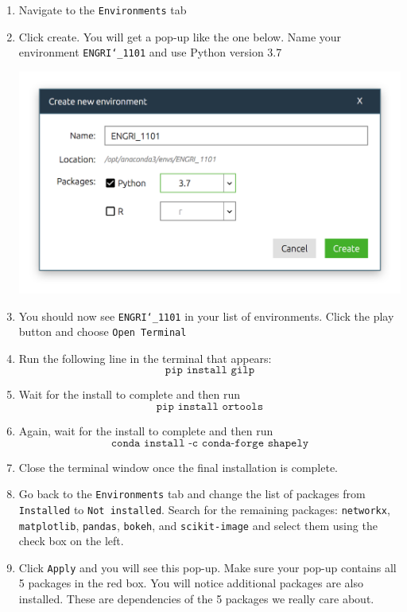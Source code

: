 \documentclass[11 pt]{article}
\begin{document}
\begin{enumerate}

\item Navigate to the \texttt{Environments} tab
\item Click create. You will get a pop-up like the one below. Name your environment \texttt{ENGRI\char`_1101} and use Python version 3.7

\begin{center}
\includegraphics[scale=0.5]{create_env}
\end{center}

\item You should now see \texttt{ENGRI\char`_1101} in your list of environments. Click the play button and choose \texttt{Open Terminal}
\item Run the following line in the terminal that appears: $$\texttt{pip install gilp}$$
\item Wait for the install to complete and then run $$\texttt{pip install ortools}$$
\item Again, wait for the install to complete and then run $$\texttt{conda install -c conda-forge shapely}$$
\item Close the terminal window once the final installation is complete.
\item Go back to the \texttt{Environments} tab and change the list of packages from \texttt{Installed} to \texttt{Not installed}. Search for the remaining packages: \texttt{networkx}, \texttt{matplotlib}, \texttt{pandas},  \texttt{bokeh}, and  \texttt{scikit-image} and select them using the check box on the left.
\item Click \texttt{Apply} and you will see this pop-up. Make sure your pop-up contains all 5 packages in the red box. You will notice additional packages are also installed. These are dependencies of the 5 packages we really care about.


\end{enumerate}
\end{document}
